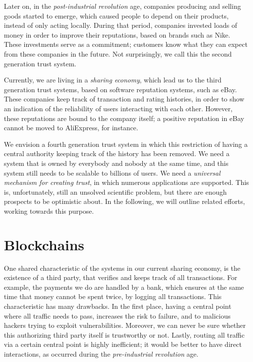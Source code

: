 Later on, in the \emph{post-industrial revolution} age, companies producing and selling goods started to emerge, which caused people to depend on their products, instead of only acting locally. During that period, companies invested loads of money in order to improve their reputations, based on brands such as Nike. These investments serve as a commitment; customers know what they can expect from these companies in the future. Not surprisingly, we call this the second generation trust system. 

Currently, we are living in a \emph{sharing economy}, which lead us to the third generation trust systems, based on software reputation systems, such as eBay. These companies keep track of transaction and rating histories, in order to show an indication of the reliability of users interacting with each other. However, these reputations are bound to the company itself; a positive reputation in eBay cannot be moved to AliExpress, for instance. 

We envision a fourth generation trust system in which this restriction of having a central authority keeping track of the history has been removed. We need a system that is owned by everybody and nobody at the same time, and this system still needs to be scalable to billions of users. We need a \emph{universal mechanism for creating trust}, in which numerous applications are supported. This is, unfortunately, still an unsolved scientific problem, but there are enough prospects to be optimistic about. In the following, we will outline related efforts, working towards this purpose. 


\section{Blockchains}
One shared characteristic of the systems in our current sharing economy, is the existence of a third party, that verifies and keeps track of all transactions. For example, the payments we do are handled by a bank, which ensures at the same time that money cannot be spent twice, by logging all transactions. This characteristic has many drawbacks. In the first place, having a central point where all traffic needs to pass, increases the risk to failure, and to malicious hackers trying to exploit vulnerabilities. Moreover, we can never be sure whether this authorizing third party itself is trustworthy or not. Lastly, routing all traffic via a certain central point is highly inefficient; it would be better to have direct interactions, as occurred during the \emph{pre-industrial revolution} age. 

